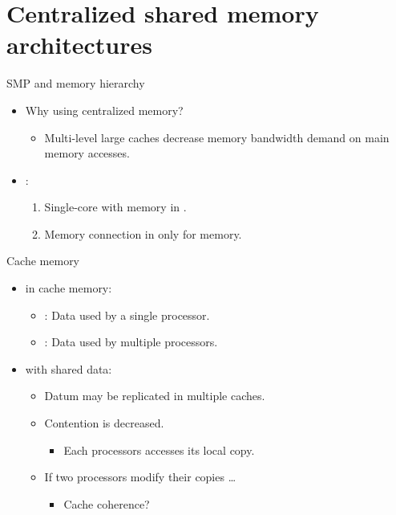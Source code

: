\section{Centralized shared memory architectures}

\begin{frame}[t]{SMP and memory hierarchy}
\begin{itemize}
  \item Why using centralized memory?
    \begin{itemize}
      \item Multi-level large caches decrease memory bandwidth demand on
            main memory accesses.
    \end{itemize}

  \item {}:
    \begin{enumerate}[1.]
      \item Single-core with memory in .
      \item Memory connection in  only for memory.
    \end{enumerate}
\end{itemize}
\end{frame}

\begin{frame}[t]{Cache memory}
\begin{itemize}
  \item {} in cache memory:
    \begin{itemize}
      \item {}: Data used by a single processor.
      \item {}: Data used by multiple processors.
    \end{itemize}

  \item {} with shared data:
    \begin{itemize}
      \item \pause Datum may be replicated in multiple caches.
      \item \pause Contention is decreased.
        \begin{itemize}
          \item Each processors accesses its local copy.
        \end{itemize}
      \item \pause If two processors modify their copies \ldots
        \begin{itemize}
          \item Cache coherence?
        \end{itemize}
    \end{itemize}
\end{itemize}
\end{frame}

